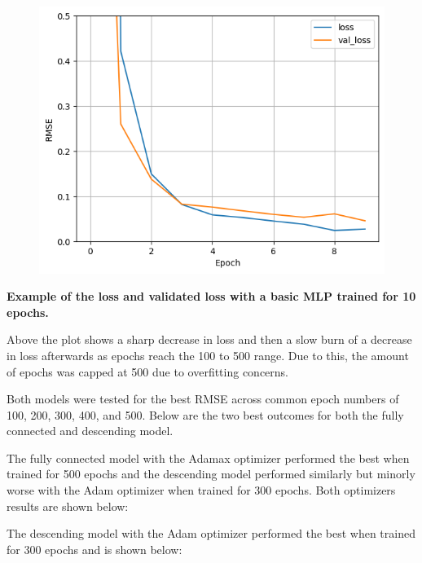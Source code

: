 \documentclass[12pt]{article}
\begin{document}
	\begin{figure}[H]
		\includegraphics[scale=0.400]{loss_example.png}
		\centering
	\end{figure}
	\begin{center}
		\textbf{\scriptsize Example of the loss and validated loss with a basic MLP trained for 10 epochs.}
	\end{center}


	Above the plot shows a sharp decrease in loss and then a slow burn of a decrease in loss afterwards as epochs reach the 100 to 500 range. Due to this, the amount of epochs was capped at 500 due to overfitting concerns.

	Both models were tested for the best RMSE across common epoch numbers of 100, 200, 300, 400, and 500. Below are the two best outcomes for both the fully connected and descending model.

	The fully connected model with the Adamax optimizer performed the best when trained for 500 epochs and the descending model performed similarly but minorly worse with the Adam optimizer when trained for 300 epochs. Both optimizers results are shown below:

	The descending model with the Adam optimizer performed the best when trained for 300 epochs and is shown below:
\end{document}
